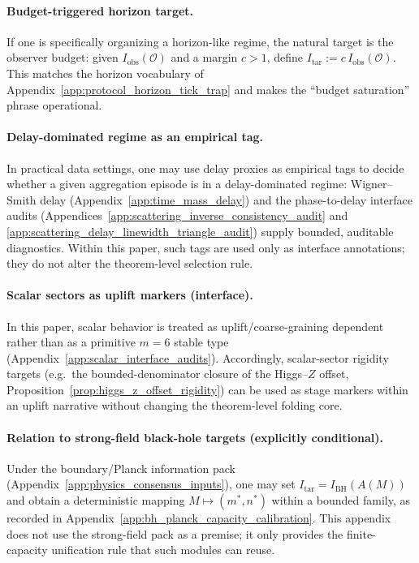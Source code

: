 \paragraph{Budget-triggered horizon target.}
\InterfaceTag If one is specifically organizing a horizon-like regime, the natural target is the observer budget:
given $I_{\mathrm{obs}}(\mathcal O)$ and a margin $c>1$, define $I_{\mathrm{tar}}:=c\,I_{\mathrm{obs}}(\mathcal O)$.
This matches the horizon vocabulary of Appendix~\ref{app:protocol_horizon_tick_trap} and makes the ``budget saturation'' phrase operational.

\paragraph{Delay-dominated regime as an empirical tag.}
\AuditTag In practical data settings, one may use delay proxies as empirical tags to decide whether a given aggregation episode is in a delay-dominated regime:
Wigner--Smith delay (Appendix~\ref{app:time_mass_delay}) and the phase-to-delay interface audits (Appendices~\ref{app:scattering_inverse_consistency_audit} and \ref{app:scattering_delay_linewidth_triangle_audit}) supply bounded, auditable diagnostics.
Within this paper, such tags are used only as interface annotations; they do not alter the theorem-level selection rule.

\paragraph{Scalar sectors as uplift markers (interface).}
\InterfaceTag In this paper, scalar behavior is treated as uplift/coarse-graining dependent rather than as a primitive $m=6$ stable type (Appendix~\ref{app:scalar_interface_audits}).
Accordingly, scalar-sector rigidity targets (e.g.\ the bounded-denominator closure of the Higgs--$Z$ offset, Proposition~\ref{prop:higgs_z_offset_rigidity}) can be used as stage markers within an uplift narrative without changing the theorem-level folding core.

\paragraph{Relation to strong-field black-hole targets (explicitly conditional).}
\MatchTag Under the boundary/Planck information pack (Appendix~\ref{app:physics_consensus_inputs}),
one may set $I_{\mathrm{tar}}=I_{\mathrm{BH}}(A(M))$ and obtain a deterministic mapping $M\mapsto(m^\ast,n^\ast)$ within a bounded family,
as recorded in Appendix~\ref{app:bh_planck_capacity_calibration}.
This appendix does not use the strong-field pack as a premise; it only provides the finite-capacity unification rule that such modules can reuse.

